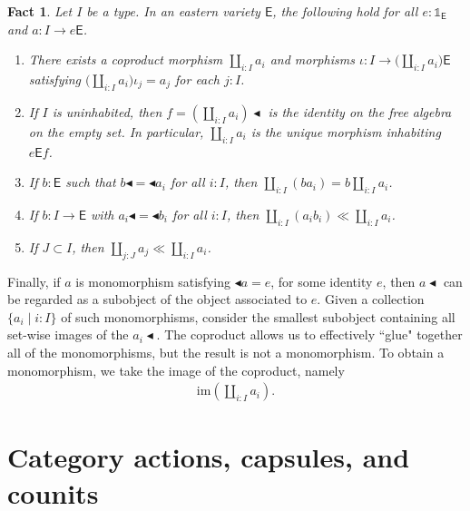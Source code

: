 \documentclass{amsart}
\newcommand{\tin}{:}
\newcommand{\acat}[1]{\mathsf{#1}}
\numberwithin{lstfloat}{section}
\newcommand{\srcfunc}{\mathbin{\blacktriangleleft}}
\newcommand{\tgtfunc}{\mathbin{\blacktriangleleft}}
\newcommand{\src}[1]{#1\srcfunc}
\newcommand{\tgt}[1]{\tgtfunc #1}
\newcommand{\one}{\mathbb{1}}
\newenvironment{ithm}{\begin{enumerate}[label={\rm(\alph*)}, ref=(\alph*),
      labelwidth=18pt, leftmargin=18pt, topsep=3pt, itemsep=1pt, parsep=2pt]}
      {\end{enumerate}}
\newtheorem{fact}[thm]{Fact}
\theoremstyle{definition}
\theoremstyle{remark}
\numberwithin{equation}{section}
\begin{document}
\begin{fact}
  \label{fact:coprod}
  Let $I$ be a type. In an eastern variety $\acat{E}$,
  the following hold for all $e:\one_{\acat{E}}$ and $a:I\to e\acat{E}$.
  \begin{ithm}
    \item\label{factpart:coprods} There exists a coproduct morphism
    $\coprod_{i:I}a_i$ and morphisms $\iota:I\to
    \big(\coprod_{i:I}a_i\big)\acat{E}$ satisfying
    $\big(\coprod_{i:I}a_i\big)\iota_j=a_j$ for each $j:I$.

    \item\label{factpart:empty-coprod} If $I$ is uninhabited, then
    $f=\src{\left(\coprod_{i:I}a_i\right)}$ is the identity on the free algebra
    on the empty set. In particular, $\coprod_{i:I}a_i$ is the unique morphism
    inhabiting $e\acat{E}f$.

    \item\label{factpart:factor-out} If $b\tin \acat{E}$ such that
    $\src{b}=\tgt{a_i}$ for all $i:I$, then $\coprod_{i:I}(b a_i)=b
    \coprod_{i:I}a_i$. 

    \item\label{factpart:ignore-inside} If $b:I\to \acat{E}$ with
    $\src{a_i}=\tgt{b_i}$ for all $i:I$, then $\coprod_{i:I} (a_i b_i)\ll
    \coprod_{i: I}a_i$.

    \item\label{factpart:smaller-coprod} If $J\subset I$, then $\coprod_{j:J}a_j
    \ll \coprod_{i:I}a_i$.
  \end{ithm}
\end{fact}

Finally, if $a$ is monomorphism satisfying 
$\tgt{a}=e$, for some identity $e$, then $\src{a}$ can be regarded as 
a subobject of the object associated to $e$. 
Given a collection $\{a_i\mid i:I\}$ of such monomorphisms,
consider the smallest subobject 
containing all set-wise images of the $\src{a_i}$.  
The coproduct allows us to effectively ``glue" together 
all of the monomorphisms, but the result is not a monomorphism.  
To obtain a monomorphism, we take the image of the coproduct, 
namely
\begin{align}\label{eq:coprod_im_comment}
  \text{im}\left(
    \coprod_{i:I} a_i
  \right).
\end{align}

\section{Category actions, capsules, and counits}
\label{sec:actions}
\end{document}
